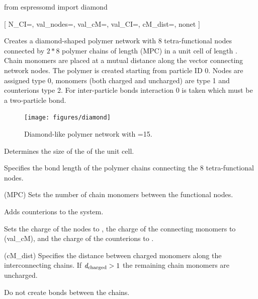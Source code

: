  \begin{pypresso}
	from espressomd import diamond 
\end{pypresso}

\begin{pysyntax}
  [
    N_CI=,
    val_nodes=,
    val_cM=,
    val_CI=,
    cM_dist=,
    nonet
  ]
\end{pysyntax}

Creates a diamond-shaped polymer network with 8 tetra-functional nodes
connected by $2*8$ polymer chains of length  (MPC) in 
a unit cell of length . Chain monomers are placed at a mutual distance 
along the vector connecting network nodes.
The polymer is created starting from particle ID 0. Nodes are assigned type 0,
monomers (both charged and uncharged) are type 1 and counterions type 2.
For inter-particle bonds interaction $0$ is taken which must be a two-particle bond.

\begin{figure}[ht]
  \label{fig:diamond}
  \begin{center}
  \texttt{[image: figures/diamond]}
  \caption{Diamond-like polymer network with =15.}
  \end{center}
\end{figure}

\begin{arguments}
\item[\var{a}] Determines the size of the of the unit cell.
\item[\var{bond\_length}] Specifies the bond length of the polymer
  chains connecting the 8 tetra-functional nodes.
\item[\var{monomers\_per\_chain}] (MPC) Sets the number of chain monomers
  between the functional nodes.
\item[\opt{counterions \var{N_\mathrm{CI}}}] Adds 
  counterions to the system.
\item[\opt{charges \var{val_\mathrm{node}} \var{val_\mathrm{monomer}}
    \var{val_\mathrm{CI}}}] Sets the charge of the nodes to
  , the charge of the connecting monomers to
   (val\_cM), and the charge of the counterions to
  .
\item[\opt{distance \var{d_\mathrm{charged}}}] (cM\_dist) Specifies the distance
  between charged monomers along the interconnecting chains. If
  $\mathrm{\mathit{d_\mathrm{charged}}} > 1$ the remaining chain monomers are
  uncharged.
  \item[\opt{nonet}] Do not create bonds between the chains.
\end{arguments}


